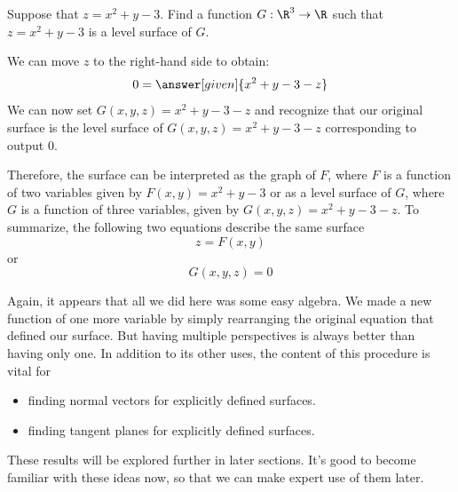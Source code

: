 \documentclass{ximera}
\begin{document}
\begin{example}
  Suppose that $z=x^2+y-3$. Find a function $G:\R^3\to\R$ such that
  $z=x^2+y-3$ is a level surface of $G$.
  
  \begin{explanation}
    We can move $z$ to the right-hand side to obtain:
    \[
    0 = \answer[given]{x^2+y-3-z}
    \]
    We can now set $G(x,y,z) = x^2+y-3-z$ and recognize that our
    original surface is the level surface of $G(x,y,z) = x^2+y-3-z$
    corresponding to output $0$.
    
   Therefore, the surface can be interpreted  as the graph of  $F$, where $F$ is a function of two variables given by $F(x,y) = x^2+y-3$ or as a level surface of $G$, where $G$ is a function of three variables, given by $G(x,y,z)=x^2+y-3-z$.
  To summarize, the following two equations describe the same surface
     \[
   z=F(x,y)
    \]
or
  \[
   G(x,y,z)=0
    \]
  \end{explanation}
\end{example}
Again, it appears that all we did here was some easy algebra.  We made
a new function of one more variable by simply rearranging the original
equation that defined our surface.  But having multiple perspectives is 
always better than having only one.  In addition to its other uses, the 
content of this procedure is vital for
\begin{itemize}
\item finding normal vectors for explicitly defined surfaces.
\item finding tangent planes for explicitly defined surfaces.
\end{itemize}

These results will be explored further in later sections.  It's good to become 
familiar with these ideas now, so that we can make expert use of them later.


\end{document}
